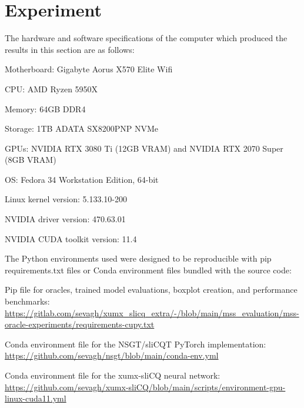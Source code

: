 \documentclass[report.tex]{subfiles}
\begin{document}
\section{Experiment}
\label{sec:experiment}

The hardware and software specifications of the computer which produced the results in this section are as follows:
\begin{tight_enumerate}
	\item
		Motherboard: Gigabyte Aorus X570 Elite Wifi
	\item
		CPU: AMD Ryzen 5950X
	\item
		Memory: 64GB DDR4
	\item
		Storage: 1TB ADATA SX8200PNP NVMe
	\item
		GPUs: NVIDIA RTX 3080 Ti (12GB VRAM) and NVIDIA RTX 2070 Super (8GB VRAM)
	\item
		OS: Fedora 34 Workstation Edition, 64-bit
	\item
		Linux kernel version: 5.133.10-200
	\item
		NVIDIA driver version: 470.63.01
	\item
		NVIDIA CUDA toolkit version: 11.4
\end{tight_enumerate}

The Python environments used were designed to be reproducible with pip requirements.txt files or Conda environment files bundled with the source code:

\begin{tight_enumerate}
	\item
		Pip file for oracles, trained model evaluations, boxplot creation, and performance benchmarks:\\
		\url{https://gitlab.com/sevagh/xumx_slicq_extra/-/blob/main/mss_evaluation/mss-oracle-experiments/requirements-cupy.txt}
	\item
		Conda environment file for the NSGT/sliCQT PyTorch implementation:\\
		\url{https://github.com/sevagh/nsgt/blob/main/conda-env.yml}
	\item
		Conda environment file for the xumx-sliCQ neural network:\\
		\href{https://github.com/sevagh/xumx-sliCQ/blob/main/scripts/environment-gpu-linux-cuda11.yml}{https://github.com/sevagh/xumx-sliCQ/blob/main/scripts/environment-gpu-linux-cuda11.yml}
\end{tight_enumerate}
\end{document}

